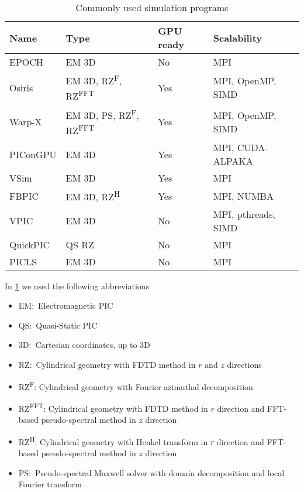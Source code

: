 \documentclass[12pt, class=report, crop=false]{standalone}
\begin{document}
\begin{table}
\centering
  \begin{tabular}{l l l l}
  \toprule
  \textbf{Name} & \textbf{Type} & \textbf{GPU ready} & \textbf{Scalability}\\
  \midrule
  EPOCH & EM 3D & No & MPI\\
  Osiris & EM 3D, RZ\textsuperscript{F}, RZ\textsuperscript{FFT} & Yes & MPI, OpenMP, SIMD\\
  Warp-X & EM 3D, PS, RZ\textsuperscript{F}, RZ\textsuperscript{FFT} & Yes & MPI, OpenMP, SIMD\\
  PIConGPU & EM 3D & Yes & MPI, CUDA-ALPAKA\\
  VSim & EM 3D & Yes & MPI\\
  FBPIC & EM 3D, RZ\textsuperscript{H} & Yes & MPI, NUMBA\\
  VPIC & EM 3D & No & MPI, pthreads, SIMD\\
  QuickPIC & QS RZ & No & MPI\\
  PICLS & EM 3D & No & MPI\\
  \bottomrule
  \end{tabular}
  \caption{Commonly used simulation programs}%
  \label{tab:pic}
\end{table}

In \cref{tab:pic} we used the following abbreviations
\begin{itemize}
    \item EM:\ Electromagnetic PIC
    \item QS:\ Quasi-Static PIC
    \item 3D:\ Cartesian coordinates, up to 3D
    \item RZ:\ Cylindrical geometry with FDTD method in \(r\) and \(z\) directions
    \item RZ\textsuperscript{F}: Cylindrical geometry with Fourier azimuthal decomposition
    \item RZ\textsuperscript{FFT}: Cylindrical geometry with FDTD method in \(r\) direction
                and FFT-based pseudo-spectral method in \(z\) direction
    \item RZ\textsuperscript{H}: Cylindrical geometry with Henkel transform in \(r\) direction
                and FFT-based pseudo-spectral method in \(z\) direction
    \item PS:\ Pseudo-spectral Maxwell solver with domain decomposition and local Fourier transform
\end{itemize}

\end{document}
